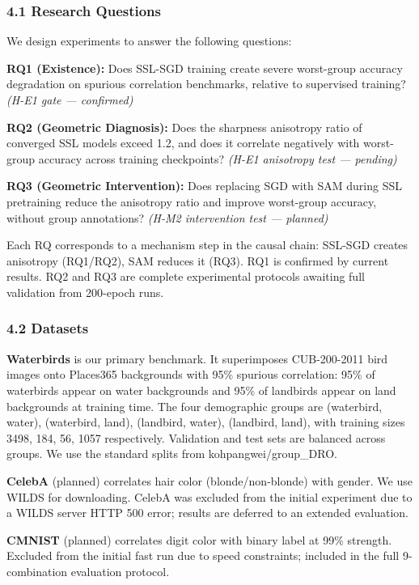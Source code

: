 
\subsubsection{4.1 Research Questions}

We design experiments to answer the following questions:

\textbf{RQ1 (Existence):} Does SSL-SGD training create severe worst-group accuracy degradation on spurious correlation benchmarks, relative to supervised training? \textit{(H-E1 gate --- confirmed)}

\textbf{RQ2 (Geometric Diagnosis):} Does the sharpness anisotropy ratio of converged SSL models exceed 1.2, and does it correlate negatively with worst-group accuracy across training checkpoints? \textit{(H-E1 anisotropy test --- pending)}

\textbf{RQ3 (Geometric Intervention):} Does replacing SGD with SAM during SSL pretraining reduce the anisotropy ratio and improve worst-group accuracy, without group annotations? \textit{(H-M2 intervention test --- planned)}

Each RQ corresponds to a mechanism step in the causal chain: SSL-SGD creates anisotropy (RQ1/RQ2), SAM reduces it (RQ3). RQ1 is confirmed by current results. RQ2 and RQ3 are complete experimental protocols awaiting full validation from 200-epoch runs.

\subsubsection{4.2 Datasets}

\textbf{Waterbirds} \citep{Sagawa2019} is our primary benchmark. It superimposes CUB-200-2011 bird images onto Places365 backgrounds with 95\% spurious correlation: 95\% of waterbirds appear on water backgrounds and 95\% of landbirds appear on land backgrounds at training time. The four demographic groups are (waterbird, water), (waterbird, land), (landbird, water), (landbird, land), with training sizes 3498, 184, 56, 1057 respectively. Validation and test sets are balanced across groups. We use the standard splits from kohpangwei/group\_DRO.

\textbf{CelebA} \citep{liu2015celeba} (planned) correlates hair color (blonde/non-blonde) with gender. We use WILDS \citep{koh2021wilds} for downloading. CelebA was excluded from the initial experiment due to a WILDS server HTTP 500 error; results are deferred to an extended evaluation.

\textbf{CMNIST} \citep{arjovsky2019invariant} (planned) correlates digit color with binary label at 99\% strength. Excluded from the initial fast run due to speed constraints; included in the full 9-combination evaluation protocol.

